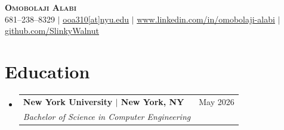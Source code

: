 \documentclass[letterpaper,11pt]{article}
\makeatletter
\newcommand{\resumeSubheading}[4]{
  \vspace{0pt}\item
    \begin{tabular*}{0.97\textwidth}[t]{l@{\extracolsep{\fill}}r}
      \textbf{#1} & #2 \\
      \textit{\small#3} & \textit{\small #4} \\
    \end{tabular*}\vspace{-5pt}
}
\newcommand{\resumeSubHeadingListStart}{\begin{itemize}[leftmargin=0.15in, label={}]}
\newcommand{\resumeSubHeadingListEnd}{\end{itemize}\vspace{-2pt}}
\makeatother
\begin{document}

\begin{center}
    \textbf{\Huge \scshape Omobolaji Alabi} \\ \vspace{1pt}
    \small 681--238--8329 $|$ \href{mailto:ooa310@nyu.edu}{\underline{ooa310[at]nyu.edu}} $|$ 
    \href{https://www.linkedin.com/in/omobolaji-alabi}{\underline{www.linkedin.com/in/omobolaji-alabi}}
     $|$ \href{https://github.com/SlinkyWalnut}{\underline{github.com/SlinkyWalnut}}
\end{center}


\section{Education}
  \resumeSubHeadingListStart
  
  \resumeSubheading
      {\textbf{New York University} $|$ New York, NY} {May 2026 \vspace{2pt}}
      {Bachelor of Science in Computer Engineering} {}
  \resumeSubHeadingListEnd


\end{document}
